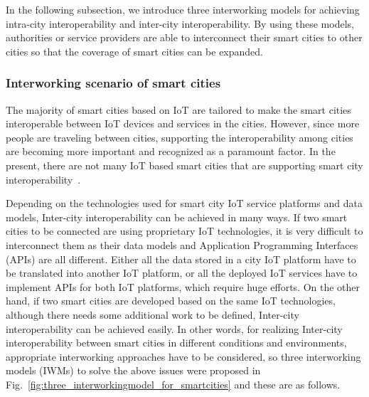 In the following subsection, we introduce three interworking models for achieving intra-city interoperability and inter-city interoperability. By using these models, authorities or service providers are able to interconnect their smart cities to other cities so that the coverage of smart cities can be expanded.

\subsubsection{Interworking scenario of smart cities}  
The majority of smart cities based on IoT are tailored to make the smart cities interoperable between IoT devices and services in the cities. However, since more people are traveling between cities, supporting the interoperability among cities are becoming more important and recognized as a paramount factor. In the present, there are not many IoT based smart cities that are supporting smart city interoperability~\cite{Petrolo2017}. 

Depending on the technologies used for smart city IoT service platforms and data models, Inter-city interoperability can be achieved in many ways. If two smart cities to be connected are using proprietary IoT technologies, it is very difficult to interconnect them as their data models and Application Programming Interfaces (APIs) are all different. Either all the data stored in a city IoT platform have to be translated into another IoT platform, or all the deployed IoT services have to implement APIs for both IoT platforms, which require huge efforts. On the other hand, if two smart cities are developed based on the same IoT technologies, although there needs some additional work to be defined, Inter-city interoperability can be achieved easily. In other words, for realizing Inter-city interoperability between smart cities in different conditions and environments, appropriate interworking approaches have to be considered, so three interworking models (IWMs) to solve the above issues were proposed in Fig.~\ref{fig:three_interworkingmodel_for_smartcities} and these are as follows.

